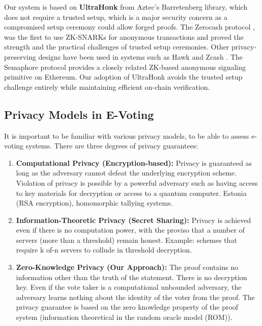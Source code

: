 \documentclass[12pt, a4paper]{report}
\begin{document}
Our system is based on \textbf{UltraHonk} from Aztec's Barretenberg library, which does not require a trusted setup, which is a major security concern as a compromised setup ceremony could allow forged proofs. The Zerocash protocol \cite{sasson2014zerocash}, was the first to use ZK-SNARKs for anonymous transactions and proved the strength and the practical challenges of trusted setup ceremonies. Other privacy-preserving designs have been used in systems such as Hawk \cite{kosba2016hawk} and Zcash \cite{zcash2016protocol}. The Semaphore protocol \cite{semaphore2020} provides a closely related ZK-based anonymous signaling primitive on Ethereum. Our adoption of UltraHonk avoids the trusted setup challenge entirely while maintaining efficient on-chain verification.

\subsection{Privacy Models in E-Voting}

It is important to be familiar with various privacy models, to be able to assess e-voting systems. There are three degrees of privacy guarantees:

\begin{enumerate}
    \item \textbf{Computational Privacy (Encryption-based):}  Privacy is guaranteed as long as the adversary cannot defeat the underlying encryption scheme. Violation of privacy is possible by a powerful adversary such as having access to key materials for decryption or access to a quantum computer. Estonia (RSA encryption), homomorphic tallying systems.
    
    \item \textbf{Information-Theoretic Privacy (Secret Sharing):} Privacy is achieved even if there is no computation power, with the proviso that a number of servers (more than a threshold) remain honest. Example: schemes that require k of-n servers to collude in threshold decryption.
    
    \item \textbf{Zero-Knowledge Privacy (Our Approach):}  The proof contains no information other than the truth of the statement. There is no decryption key. Even if the vote taker is a computational unbounded adversary, the adversary learns nothing about the identity of the voter from the proof. The privacy guarantee is based on the zero knowledge property of the proof system (information theoretical in the random oracle model (ROM)).
\end{enumerate}
\end{document}
